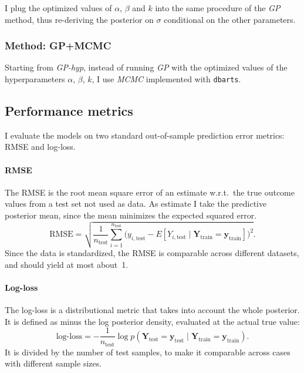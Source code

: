 \documentclass[a4paper]{article}
\theoremstyle{definition}
\begin{document}
    I plug the optimized values of $\alpha$, $\beta$ and $k$ into the same procedure of the \emph{GP} method, thus re-deriving the posterior on $\sigma$ conditional on the other parameters.

    \subsubsection{Method: GP+MCMC}
    \label{sec:modelgpmcmc}

    Starting from \emph{GP-hyp}, instead of running \emph{GP} with the optimized values of the hyperparameters $\alpha$, $\beta$, $k$, I use \emph{MCMC} implemented with \texttt{dbarts}.

    \subsection{Performance metrics}

    I evaluate the models on two standard out-of-sample prediction error metrics: RMSE and log-loss.

    \paragraph{RMSE}

    The RMSE is the root mean square error of an estimate w.r.t.\ the true outcome values from a test set not used as data. As estimate I take the predictive posterior mean, since the mean minimizes the expected squared error.
    \begin{equation}
        \mathrm{RMSE} = \sqrt{
            \frac 1{n_\text{test}} \sum_{i=1}^{n_\text{test}}
            \big(
                y_{i,\text{test}} -
                E[Y_{i,\text{test}}\mid \mathbf Y_\text{train} = \mathbf y_\text{train}]
            \big)^2
        }.
    \end{equation}
    Since the data is standardized, the RMSE is comparable across different datasets, and should yield at most about~1.

    \paragraph{Log-loss}

    The log-loss is a distributional metric that takes into account the whole posterior. It is defined as minus the log posterior density, evaluated at the actual true value:
    \begin{equation}
        \text{log-loss} =
            -\frac1{n_\text{test}}
            \log p(\mathbf Y_\text{test}=\mathbf y_\text{test}\mid \mathbf Y_\text{train} = \mathbf y_\text{train}).
    \end{equation}
    It is divided by the number of test samples, to make it comparable across cases with different sample sizes.
\end{document}
